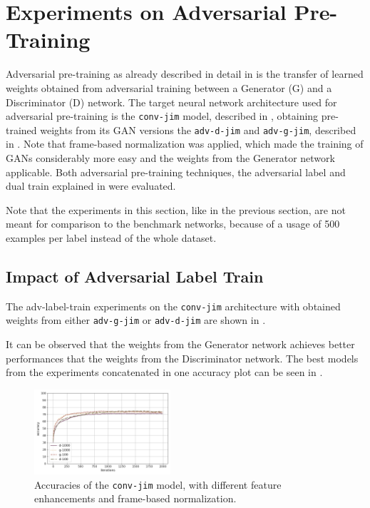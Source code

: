 
\section{Experiments on Adversarial Pre-Training}\label{sec:exp_adv}
\thesisStateNotReady
Adversarial pre-training as already described in detail in  is the transfer of learned weights obtained from adversarial training between a Generator (G) and a Discriminator (D) network.
The target neural network architecture used for adversarial pre-training is the \texttt{conv-jim} model, described in , obtaining pre-trained weights from its GAN versions the \texttt{adv-d-jim} and \texttt{adv-g-jim}, described in .
Note that frame-based normalization was applied, which made the training of GANs considerably more easy and the weights from the Generator network applicable.
Both adversarial pre-training techniques, the adversarial label and dual train explained in  were evaluated.

Note that the experiments in this section, like in the previous section, are not meant for comparison to the benchmark networks, because of a usage of 500 examples per label instead of the whole dataset.



\subsection{Impact of Adversarial Label Train}\label{sec:exp_adv_label}
The adv-label-train experiments on the \texttt{conv-jim} architecture with obtained weights from either \texttt{adv-g-jim} or \texttt{adv-d-jim} are shown in .

It can be observed that the weights from the Generator network achieves better performances that the weights from the Discriminator network.
The best models from the experiments concatenated in one accuracy plot can be seen in .

\begin{figure}[!ht]
  \centering
  \includegraphics[width=0.45\textwidth]{./5_exp/figs/exp_adv_label_acc_conv-jim}
  \caption{Accuracies of the \texttt{conv-jim} model, with different feature enhancements and frame-based normalization.}
  \label{fig:exp_adv_label_acc_conv-jim}
\end{figure}
\FloatBarrier
\noindent

